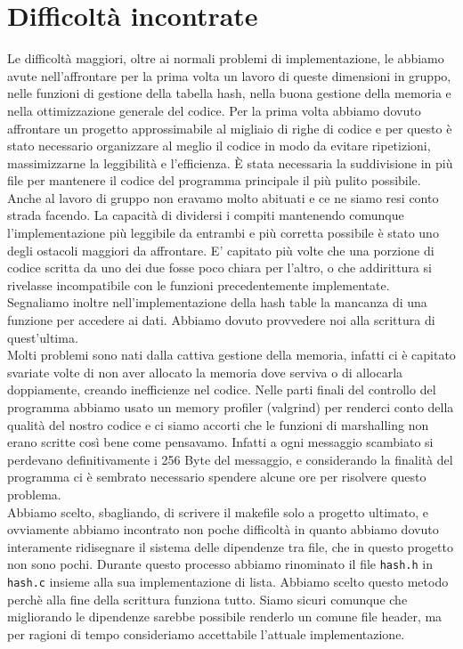 \documentclass[a4paper, 11pt]{article} %
\begin{document}
\section*{Difficoltà incontrate}
Le difficoltà maggiori, oltre ai normali problemi di implementazione, le abbiamo avute nell'affrontare per la prima volta un lavoro di queste dimensioni in gruppo, nelle funzioni di gestione della tabella hash, nella buona gestione della memoria e nella ottimizzazione generale del codice.
Per la prima volta abbiamo dovuto affrontare un progetto approssimabile al migliaio di righe di codice e per questo è stato necessario organizzare al meglio il codice in modo da evitare ripetizioni, massimizzarne la leggibilità e l'efficienza. È stata necessaria la suddivisione in più file per mantenere il codice del programma principale il più pulito possibile.\\
Anche al lavoro di gruppo non eravamo molto abituati e ce ne siamo resi conto strada facendo. La capacità di dividersi i compiti mantenendo comunque l'implementazione più leggibile da entrambi e più corretta possibile è stato uno degli ostacoli maggiori da affrontare. E' capitato più volte che una porzione di codice scritta da uno dei due fosse poco chiara per l'altro, o che addirittura si rivelasse incompatibile con le funzioni precedentemente implementate.\\
Segnaliamo inoltre nell'implementazione della hash table la mancanza di una funzione per accedere ai dati. Abbiamo dovuto provvedere noi alla scrittura di quest'ultima.\\
Molti problemi sono nati dalla cattiva gestione della memoria, infatti ci è capitato svariate volte di non aver allocato la memoria dove serviva o di allocarla doppiamente, creando inefficienze nel codice. Nelle parti finali del controllo del programma abbiamo usato un memory profiler (valgrind) per renderci conto della qualità del nostro codice e ci siamo accorti che le funzioni di marshalling non erano scritte così bene come pensavamo. Infatti a ogni messaggio scambiato si perdevano definitivamente i 256 Byte del messaggio, e considerando la finalità del programma ci è sembrato necessario spendere alcune ore per risolvere questo problema.\\
Abbiamo scelto, sbagliando, di scrivere il makefile solo a progetto ultimato, e ovviamente abbiamo incontrato non poche difficoltà in quanto abbiamo dovuto interamente ridisegnare il sistema delle dipendenze tra file, che in questo progetto non sono pochi. Durante questo processo abbiamo rinominato il file \texttt{hash.h} in \texttt{hash.c} insieme alla sua implementazione di lista. Abbiamo scelto questo metodo perchè alla fine della scrittura funziona tutto. Siamo sicuri comunque che migliorando le dipendenze sarebbe possibile renderlo un comune file header, ma per ragioni di tempo consideriamo accettabile l'attuale implementazione.
\end{document}
